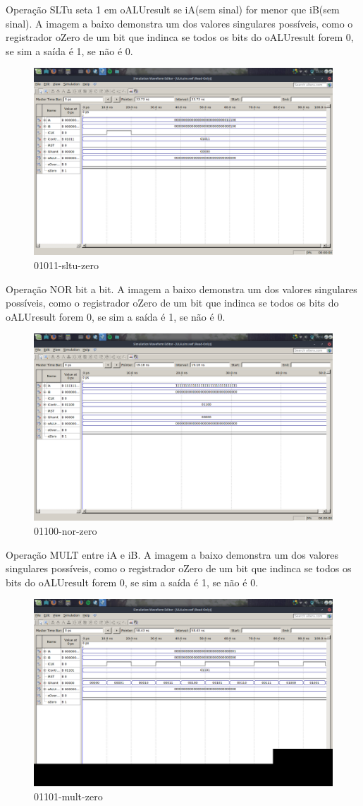 \documentclass[12pt]{article}
\begin{document}
Operação SLTu seta 1 em oALUresult se iA(sem sinal) for menor que iB(sem sinal).
A imagem a baixo demonstra um dos valores singulares possíveis, como o registrador oZero de um bit que indinca se todos os bits do oALUresult forem 0, se sim a saída é 1, se não é 0.
\begin{figure}[H]
	\centering
	\includegraphics[width=.8\textwidth]{01011-sltu-zero.png}
	\caption{01011-sltu-zero}
	\label{fig:01011-sltu-zero}
\end{figure}
Operação NOR bit a bit.
A imagem a baixo demonstra um dos valores singulares possíveis, como o registrador oZero de um bit que indinca se todos os bits do oALUresult forem 0, se sim a saída é 1, se não é 0.
\begin{figure}[H]
	\centering
	\includegraphics[width=.8\textwidth]{01100-nor-zero.png}
	\caption{01100-nor-zero}
	\label{fig:01100-nor-zero}
\end{figure}
Operação MULT entre iA e iB.
A imagem a baixo demonstra um dos valores singulares possíveis, como o registrador oZero de um bit que indinca se todos os bits do oALUresult forem 0, se sim a saída é 1, se não é 0.
\begin{figure}[H]
	\centering
	\includegraphics[width=.8\textwidth]{01101-mult-zero.png}
	\caption{01101-mult-zero}
	\label{fig:01101-mult-zero}
\end{figure}
\end{document}
